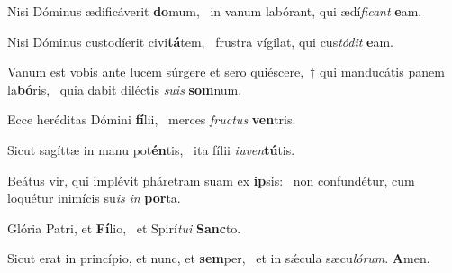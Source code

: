 \item Nisi Dóminus ædificáverit \textbf{do}mum,~\psstar{} in vanum labórant, qui ædí\textit{ficant} \textbf{e}am.

\item Nisi Dóminus custodíerit civi\textbf{tá}tem,~\psstar{} frustra vígilat, qui cus\textit{tódit} \textbf{e}am.

\item Vanum est vobis ante lucem súrgere et sero quiéscere,~† qui manducátis panem la\textbf{bó}ris,~\psstar{} quia dabit diléctis \textit{suis} \textbf{som}num.

\item Ecce heréditas Dómini \textbf{fí}lii,~\psstar{} merces \textit{fructus} \textbf{ven}tris.

\item Sicut sagíttæ in manu pot\textbf{én}tis,~\psstar{} ita fílii \textit{iuven}\textbf{tú}tis.

\item Beátus vir, qui implévit pháretram suam ex \textbf{ip}sis:~\psstar{} non confundétur, cum loquétur inimícis su\textit{is} \textit{in} \textbf{por}ta.

\item Glória Patri, et \textbf{Fí}lio,~\psstar{} et Spirí\textit{tui} \textbf{Sanc}to.

\item Sicut erat in princípio, et nunc, et \textbf{sem}per,~\psstar{} et in sǽcula sæcu\textit{lórum}. \textbf{A}men.